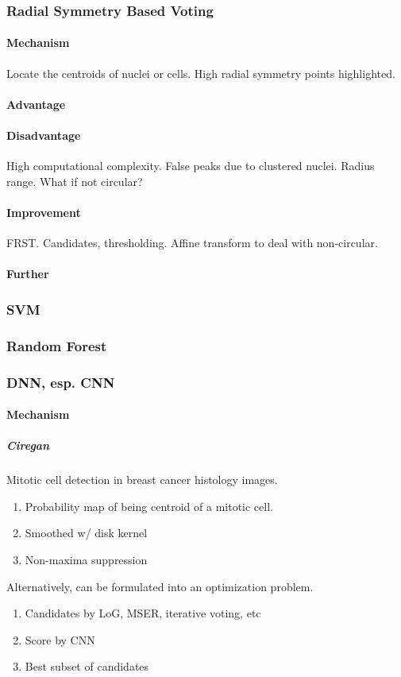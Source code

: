 \documentclass[10pt,a4paper]{article}
\begin{document}
\subsubsection{Radial Symmetry Based Voting}
\paragraph{Mechanism}
Locate the centroids of nuclei or cells. High radial symmetry points highlighted.
\paragraph{Advantage}
\paragraph{Disadvantage}
High computational complexity. False peaks due to clustered nuclei. Radius range. What if not circular?
\paragraph{Improvement}
FRST. Candidates, thresholding. Affine transform to deal with non-circular.
\paragraph{Further}

\subsubsection{SVM}

\subsubsection{Random Forest}
\subsubsection{DNN, esp. CNN}
\paragraph{Mechanism}


\subparagraph{Ciregan} Mitotic cell detection in breast cancer histology images.
\begin{enumerate}
	\item Probability map of being centroid of a mitotic cell.
	\item Smoothed w/ disk kernel
	\item Non-maxima suppression
\end{enumerate}
Alternatively, can be formulated into an optimization problem.
\begin{enumerate}
	\item Candidates by LoG, MSER, iterative voting, etc
	\item Score by CNN
	\item Best subset of candidates
\end{enumerate}
\end{document}

